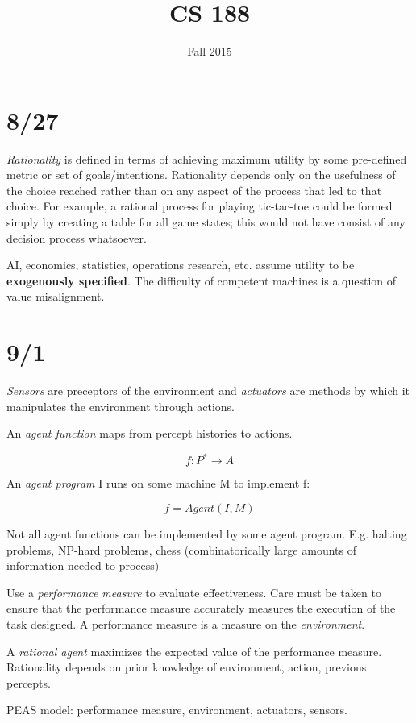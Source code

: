 \documentclass[12pt]{article}
\title{CS 188}
\date{\normalsize Fall 2015}
\begin{document}
\maketitle

\section{8/27}

\textit{Rationality} is defined in terms of achieving maximum utility by some pre-defined metric or set of goals/intentions.  Rationality depends only on the usefulness of the choice reached rather than on any aspect of the process that led to that choice.  For example, a rational process for playing tic-tac-toe could be formed simply by creating a table for all game states; this would not have consist of any decision process whatsoever.

AI, economics, statistics, operations research, etc. assume utility to be \textbf{exogenously specified}.  The difficulty of competent machines is a question of value misalignment.

\section{9/1}

\textit{Sensors} are preceptors of the environment and \textit{actuators} are methods by which it manipulates the environment through actions.

An \textit{agent function} maps from percept histories to actions.

$$f: P^* \to A$$

An \textit{agent program} I runs on some machine M to implement f:

$$f = Agent(I, M)$$

Not all agent functions can be implemented by some agent program.  E.g. halting problems, NP-hard problems, chess (combinatorically large amounts of information needed to process)

Use a \textit{performance measure} to evaluate effectiveness.  Care must be taken to ensure that the performance measure accurately measures the execution of the task designed.  A performance measure is a measure on the \textit{environment}.

A \textit{rational agent} maximizes the expected value of the performance measure.  Rationality depends on prior knowledge of environment, action, previous percepts.

PEAS model: performance measure, environment, actuators, sensors.
\end{document}
